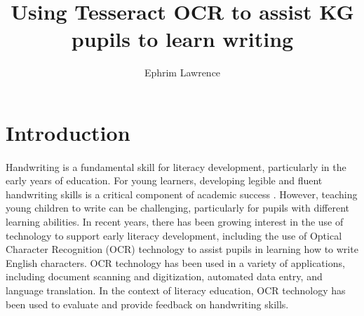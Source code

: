 \documentclass[twocolumn,oneside,12pt,a4paper]{article}
\begin{document}
\title{Using Tesseract OCR to assist KG pupils to learn writing}
\author{Ephrim Lawrence}
\date{}


\section{Introduction}
\paragraph*{}
Handwriting is a fundamental skill for literacy development, particularly in the early years of education. For young learners, developing legible and fluent handwriting skills is a critical component of academic success \cite{berninger_writing_2002,dinehart_associations_2013,longcamp_influence_2005,longcamp_remembering_2006}. However, teaching young children to write can be challenging, particularly for pupils with different learning abilities. In recent years, there has been growing interest in the use of technology to support early literacy development, including the use of Optical Character Recognition (OCR) technology to assist pupils in learning how to write English characters. OCR technology has been used in a variety of applications, including document scanning and digitization, automated data entry, and language translation. In the context of literacy education, OCR technology has been used to evaluate and provide feedback on handwriting skills.
\end{document}
